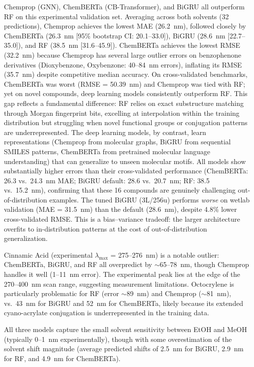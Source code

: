 \documentclass[journal=jcisd8,manuscript=article]{achemso}
\begin{document}
Chemprop (GNN), ChemBERTa (CB-Transformer), and BiGRU all outperform RF on this experimental validation set. Averaging across both solvents (32 predictions), Chemprop achieves the lowest MAE (26.2~nm), followed closely by ChemBERTa (26.3~nm [95\% bootstrap CI: 20.1--33.0]), BiGRU (28.6~nm [22.7--35.0]), and RF (38.5~nm [31.6--45.9]).
ChemBERTa achieves the lowest RMSE (32.2~nm) because Chemprop has several large outlier errors on benzophenone derivatives (Dioxybenzone, Oxybenzone: 40--84~nm errors), inflating its RMSE (35.7~nm) despite competitive median accuracy.
On cross-validated benchmarks, ChemBERTa was worst (RMSE = 50.39~nm) and Chemprop was tied with RF; yet on novel compounds, deep learning models consistently outperform RF.
This gap reflects a fundamental difference: RF relies on exact substructure matching through Morgan fingerprint bits, excelling at interpolation within the training distribution but struggling when novel functional groups or conjugation patterns are underrepresented.
The deep learning models, by contrast, learn representations (Chemprop from molecular graphs, BiGRU from sequential SMILES patterns, ChemBERTa from pretrained molecular language understanding) that can generalize to unseen molecular motifs.
All models show substantially higher errors than their cross-validated performance (ChemBERTa: 26.3 vs.\ 24.3~nm MAE; BiGRU default: 28.6 vs.\ 20.7~nm; RF: 38.5 vs.\ 15.2~nm), confirming that these 16 compounds are genuinely challenging out-of-distribution examples.
The tuned BiGRU (3L/256u) performs \textit{worse} on wetlab validation (MAE = 31.5~nm) than the default (28.6~nm), despite 4.8\% lower cross-validated RMSE. This is a bias--variance tradeoff: the larger architecture overfits to in-distribution patterns at the cost of out-of-distribution generalization.

Cinnamic Acid (experimental $\lambda_{\max}$ = 275--276~nm) is a notable outlier: ChemBERTa, BiGRU, and RF all overpredict by $\sim$65--78~nm, though Chemprop handles it well (1--11~nm error).
The experimental peak lies at the edge of the 270--400~nm scan range, suggesting measurement limitations.
Octocrylene is particularly problematic for RF (error $\sim$89~nm) and Chemprop ($\sim$81~nm), vs.\ 43~nm for BiGRU and 52~nm for ChemBERTa, likely because its extended cyano-acrylate conjugation is underrepresented in the training data.

All three models capture the small solvent sensitivity between EtOH and MeOH (typically 0--1~nm experimentally), though with some overestimation of the solvent shift magnitude (average predicted shifts of 2.5~nm for BiGRU, 2.9~nm for RF, and 4.9~nm for ChemBERTa).
\end{document}
